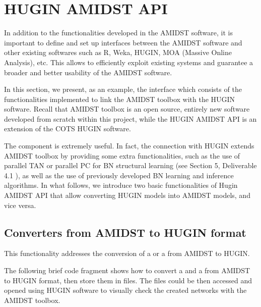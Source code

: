 \section{HUGIN AMIDST API} \label{sec:HuginLink}

In addition to the functionalities developed in the AMIDST software, it is important to define and set up interfaces between the AMIDST software and other existing softwares such as R, Weka, HUGIN, MOA (Massive Online Analysis), etc. This allows to efficiently exploit existing systems and guarantee a broader and better usability of the AMIDST software.

In this section, we present, as an example, the  interface which consists of the functionalities implemented to link the AMIDST toolbox with the HUGIN software. Recall that AMIDST toolbox is an open source, entirely new software developed from scratch within this project, while the HUGIN AMIDST API is an extension of the COTS HUGIN software. 

The  component is extremely useful. In fact, the connection with HUGIN extends AMIDST toolbox by providing some extra functionalities, such as the use of parallel TAN or parallel PC for BN structural learning (see Section 5, Deliverable 4.1 \cite{Deliverable 4.1}), as well as the use of previously developed BN learning and inference algorithms. In what follows, we introduce two basic functionalities of Hugin AMIDST API that allow converting HUGIN models into AMIDST models, and vice versa. 

\subsection{Converters from AMIDST to HUGIN format} \label{ConverterFromAmidstToHugin}

This functionality addresses the conversion of a  or a  from AMIDST to HUGIN. 

The following brief code fragment shows how to convert a  and a  from AMIDST to HUGIN format, then store them in files. The files could be then accessed and opened using HUGIN software to visually check the created networks with the AMIDST toolbox. 


